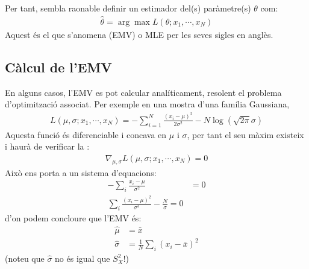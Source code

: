 \documentclass[letterpaper,10pt,english]{sphinxmanual}
\begin{document}
Per tant, sembla raonable definir un estimador del(s)
paràmetre(s) \(\theta\) com:
\begin{equation*}
\begin{split}\hat{\theta} = \arg \max L(\theta; x_1, \cdots, x_N)\end{split}
\end{equation*}
Aquest és el que s’anomena  (EMV) o MLE per les
seves sigles en anglès.


\subsection{Càlcul de l’EMV}
\label{\detokenize{0_Intro/0_3_Estimacio:calcul-de-l-emv}}
En alguns casos, l’EMV es pot calcular
analíticament, resolent el problema d’optimització associat.
Per exemple en una mostra d’una família Gaussiana,
\begin{equation*}
\begin{split}L(\mu, \sigma; x_1, \cdots, x_N) = - \sum_{i=1}^N \frac{(x_i - \mu)^2}{2\sigma^2} - N \log(\sqrt{2 \pi} \sigma)\end{split}
\end{equation*}
Aquesta funció és diferenciable i concava en \(\mu\) i  \(\sigma\),
per tant el seu màxim existeix i haurà de verificar la :
\begin{equation*}
\begin{split}\nabla_{\mu, \sigma} L(\mu, \sigma; x_1, \cdots, x_N) = 0\end{split}
\end{equation*}
Això ens porta a un sistema d’equacions:
\begin{equation*}
\begin{split}- \sum_i \frac{x_i - \mu}{\sigma^2} &= 0 \\
\sum_i \frac{(x_i - \mu)^2}{\sigma^3} - \frac{N}{\sigma} = 0\end{split}
\end{equation*}
d’on podem concloure que l’EMV és:
\begin{equation*}
\begin{split}\hat{\mu} &= \bar{x} \\
\hat{\sigma} &= \frac{1}{N}\sum_i (x_i - \bar{x})^2\end{split}
\end{equation*}
(noteu que \(\hat{\sigma}\) no és igual que \(S_X^2\)!)
\end{document}
